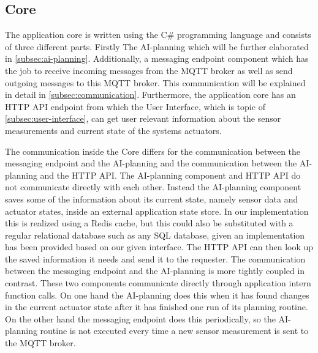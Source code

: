 \subsection{Core}\label{subsec:core}

The application core is written using the C\# programming language and consists of three different parts.
Firstly The AI-planning which will be further elaborated in \cref{subsec:ai-planning}.
Additionally, a messaging endpoint component which has the job to receive incoming messages from the MQTT broker as well as send outgoing messages to this MQTT broker.
This communication will be explained in detail in \cref{subsec:communication}.
Furthermore, the application core has an HTTP API endpoint from which the User Interface, which is topic of \cref{subsec:user-interface}, can get user relevant information about the sensor measurements and current state of the systems actuators.

The communication inside the Core differs for the communication between the messaging endpoint and the AI-planning and the communication between the AI-planning and the HTTP API.
The AI-planning component and HTTP API do not communicate directly with each other.
Instead the AI-planning component saves some of the information about its current state, namely sensor data and actuator states, inside an external application state store.
In our implementation this is realized using a Redis cache, but this could also be substituted with a regular relational database such as any SQL database, given an implementation has been provided based on our given interface.
The HTTP API can then look up the saved information it needs and send it to the requester.
The communication between the messaging endpoint and the AI-planning is more tightly coupled in contrast.
These two components communicate directly through application intern function calls.
On one hand the AI-planning does this when it has found changes in the current actuator state after it has finished one run of its planning routine.
On the other hand the messaging endpoint does this periodically, so the AI-planning routine is not executed every time a new sensor measurement is sent to the MQTT broker.
